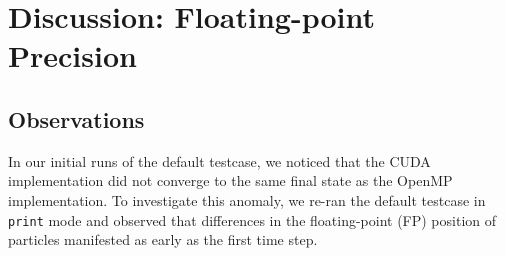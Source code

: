 \documentclass[12pt]{article}
\begin{document}
\pagebreak

\section{Discussion: Floating-point Precision}

\subsection{Observations}
In our initial runs of the default testcase, we noticed that the CUDA implementation did not converge to the same final state as the OpenMP implementation. To investigate this anomaly, we re-ran the default testcase in \texttt{print} mode and observed that differences in the floating-point (FP) position of particles manifested as early as the first time step.
\end{document}

